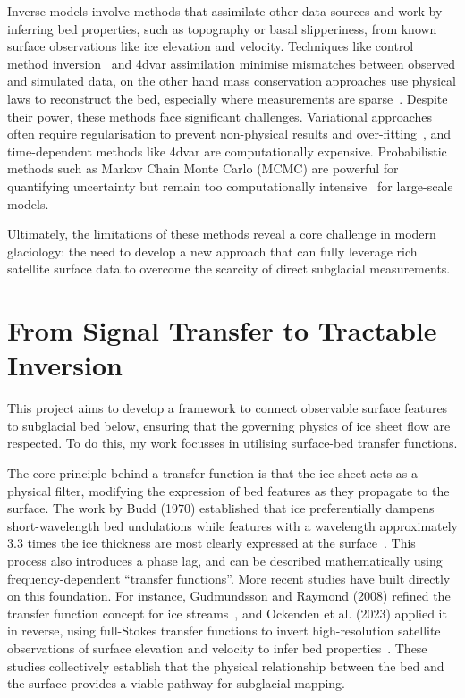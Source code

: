 Inverse models involve methods that assimilate other data sources and work by inferring bed properties, such as topography or basal slipperiness, from known surface observations like ice elevation and velocity. Techniques like control method inversion~\cite{deRydt_2013} and 4dvar assimilation minimise mismatches between observed and simulated data, on the other hand mass conservation approaches use physical laws to reconstruct the bed, especially where measurements are sparse~\cite{Morlighem_2017, Morlighem_2020}. Despite their power, these methods face significant challenges. Variational approaches often require regularisation to prevent non-physical results and over-fitting~\cite{Morlighem_Goldberg_2024}, and time-dependent methods like 4dvar are computationally expensive. Probabilistic methods such as Markov Chain Monte Carlo (MCMC) are powerful for quantifying uncertainty but remain too computationally intensive~\cite{Morlighem_Goldberg_2024} for large-scale models.

Ultimately, the limitations of these methods reveal a core challenge in modern glaciology: the need to develop a new approach that can fully leverage rich satellite surface data to overcome the scarcity of direct subglacial measurements. 

\section{From Signal Transfer to Tractable Inversion}\label{theoretical_frameworks}

This project aims to develop a framework to connect observable surface features to subglacial bed below, ensuring that the governing physics of ice sheet flow are respected. To do this, my work focusses in utilising surface-bed transfer functions.

The core principle behind a transfer function is that the ice sheet acts as a physical filter, modifying the expression of bed features as they propagate to the surface. The work by Budd (1970) established that ice preferentially dampens short-wavelength bed undulations while features with a wavelength approximately $3.3$ times the ice thickness are most clearly expressed at the surface~\cite{Budd_1970}. This process also introduces a phase lag, and can be described mathematically using frequency-dependent ``transfer functions''. More recent studies have built directly on this foundation. For instance, Gudmundsson and Raymond (2008) refined the transfer function concept for ice streams~\cite{Gudmundsson_2008}, and Ockenden et al. (2023) applied it in reverse, using full-Stokes transfer functions to invert high-resolution satellite observations of surface elevation and velocity to infer bed properties~\cite{Ockenden_2023}. These studies collectively establish that the physical relationship between the bed and the surface provides a viable pathway for subglacial mapping.

